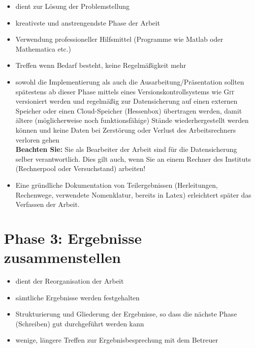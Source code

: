 \begin{itemize}
  \item dient zur Lösung der Problemstellung
  \item kreativste und anstrengendste Phase der Arbeit
  \item Verwendung professioneller Hilfsmittel (Programme wie Matlab oder Mathematica etc.)
  \item Treffen wenn Bedarf besteht, keine Regelmäßigkeit mehr
  \item sowohl die Implementierung als auch die Ausarbeitung/Präsentation sollten spätestens ab dieser Phase mittels eines Versionskontrollsystems wie \bspw \textsc{Git} versioniert werden und regelmäßig zur Datensicherung auf einen externen Speicher oder einen Cloud-Speicher (\zB Hessenbox) übertragen werden, damit ältere (möglicherweise noch funktionsfähige) Stände wiederhergestellt werden können und keine Daten bei Zerstörung oder Verlust des Arbeitsrechners verloren gehen\\
    \textbf{Beachten Sie:}
    Sie als Bearbeiter der Arbeit sind für die Datensicherung selber verantwortlich.
    Dies gilt auch, wenn Sie an einem Rechner des Instituts (Rechnerpool oder Versuchstand) arbeiten!
  \item Eine gründliche Dokumentation von Teilergebnissen (Herleitungen, Rechenwege, verwendete Nomenklatur, \zB bereits in Latex) erleichtert später das Verfassen der Arbeit.
\end{itemize}


\section{Phase 3: Ergebnisse zusammenstellen}
\label{sec:Ergebnisse}

\begin{itemize}
  \item dient der Reorganisation der Arbeit
  \item sämtliche Ergebnisse werden festgehalten
  \item Strukturierung und Gliederung der Ergebnisse, so dass die nächste Phase (Schreiben) gut durchgeführt werden kann
  \item wenige, längere Treffen zur Ergebnisbesprechung mit dem Betreuer
\end{itemize}



